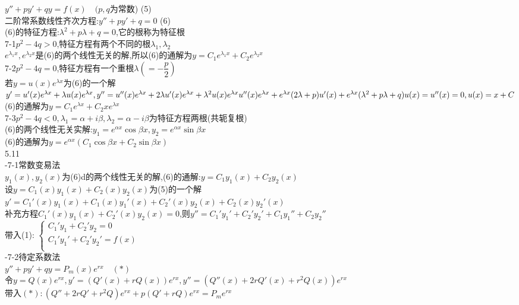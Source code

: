\documentclass[11pt, a4paper, UTF8]{ctexart}
\begin{document}
$ y''+py'+qy=f(x)\quad (p,q $为常数) (5)\\
二阶常系数线性齐次方程:$ y''+py'+q=0 $ (6)\\
(6)的特征方程:$ \lambda^2+p\lambda+q=0 $,它的根称为特征根\\
7-1$ p^2-4q>0 $,特征方程有两个不同的根$ \lambda_1,\lambda_2 $\\
$ e^{\lambda_1x},e^{\lambda_2x} $是(6)的两个线性无关的解,所以(6)的通解为$ y=C_1e^{\lambda_1x}+C_2e^{\lambda_2x} $\\
7-2$ p^2-4q=0 $,特征方程有一个重根$ \lambda(=-\dfrac{p}{2}) $\\
若$ y=u(x)e^{\lambda x} $为(6)的一个解\\
$ y'=u'(x)e^{\lambda x}+\lambda u(x)e^{\lambda x},y''=u''(x)e^{\lambda x}+2\lambda u'(x)e^{\lambda x}+\lambda^2u(x)e^{\lambda x}\\
u''(x)e^{\lambda x}+e^{\lambda x}(2\lambda+p)u'(x)+e^{\lambda x}(\lambda^2+p\lambda+q)u(x)=u''(x)=0,u(x)=x+C $\\
(6)的通解为$ y=C_1e^{\lambda x}+C_2xe^{\lambda x} $\\
7-3$ p^2-4q<0,\lambda_1=\alpha+i\beta,\lambda_2=\alpha-i\beta $为特征方程两根(共轭复根)\\
(6)的两个线性无关实解:$ y_1=e^{\alpha x}\cos\beta x,y_2=e^{\alpha x}\sin\beta x $\\
(6)的通解为$ y=e^{\alpha x}(C_1\cos\beta x+C_2\sin\beta x) $\\
5.11\\
-7-1常数变易法\\
$ y_1(x),y_2(x) $为(6)d的两个线性无关的解,(6)的通解:$ y=C_1y_1(x)+C_2y_2(x) $\\
设$ y=C_1(x)y_1(x)+C_2(x)y_2(x) $为(5)的一个解\\
$ y'=C_1'(x)y_1(x)+C_1(x)y_1'(x)+C_2'(x)y_2(x)+C_2(x)y_2'(x) $\\
补充方程$ C_1'(x)y_1(x)+C_2'(x)y_2(x)=0 $,则$ y''=C_1'y_1'+C_2'y_2'+C_1y_1''+C_2y_2'' $\\
带入(1):
$
\left\{
\begin{array}{l}
C_1'y_1+C_2'y_2=0\\
C_1'y_1'+C_2'y_2'=f(x)\\
\end{array}
\right.
$\\
-7-2待定系数法\\
$ y''+py'+qy=P_m(x)e^{rx}\quad (*) $\\
令$ y=Q(x)e^{rx},y'=(Q'(x)+rQ(x))e^{rx},y''=(Q''(x)+2rQ'(x)+r^2Q(x))e^{rx} $\\
带入$ (*):(Q''+2rQ'+r^2Q)e^{rx}+p(Q'+rQ)e^{rx}=P_me^{rx} $\\
\end{document}
